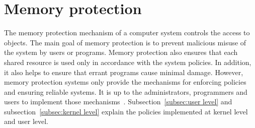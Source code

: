 \section{Memory protection}
The memory protection mechanism of a computer system controls the access to objects. The main goal of memory protection is to prevent malicious misuse of the system by users or programs. Memory protection also ensures that each shared resource is used only in accordance with the system policies. In addition, it also helps to ensure that errant programs cause minimal damage. However, memory protection systems only provide the mechanisms for enforcing policies and ensuring reliable systems. It is up to the administrators, programmers and users to implement those mechanisms~\cite{Galvin, Graham:1971:PPP:1478873.1478928}. Subsection~\ref{subsec:user level} and subsection~\ref{subsec:kernel level} explain the policies implemented at kernel level and user level. 

